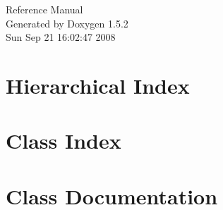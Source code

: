 \documentclass[a4paper]{book}
\begin{document}
\begin{titlepage}
\vspace*{7cm}
\begin{center}
{\Large Reference Manual}\\
\vspace*{1cm}
{\large Generated by Doxygen 1.5.2}\\
\vspace*{0.5cm}
{\small Sun Sep 21 16:02:47 2008}\\
\end{center}
\end{titlepage}
\clearemptydoublepage
{}
\tableofcontents
\clearemptydoublepage
{}
\chapter{Hierarchical Index}

\chapter{Class Index}

\chapter{Class Documentation}










\printindex
\end{document}
